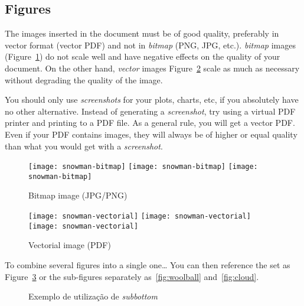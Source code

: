 	\subsection{Figures} %
	
	The images inserted in the document must be of good quality, preferably in vector format (vector PDF) and not in \emph{bitmap} (PNG, JPG, etc.). \emph{bitmap} images (Figure~\ref{fig:Figures_Tree_silhouettes-bitmap}) do not scale well and have negative effects on the quality of your document. On the other hand, \emph{vector} images {Figure~\ref{fig:Figures_Tree_silhouettes-vectorial}} scale as much as necessary without degrading the quality of the image.
	
	You should only use \emph{screenshots} for your plots, charts, etc, if you absolutely have no other alternative. Instead of generating a \emph{screenshot}, try using a virtual PDF printer and printing to a PDF file. As a general rule, you will get a vector PDF. Even if your PDF contains images, they will always be of higher or equal quality than what you would get with a \emph{screenshot}.
	
	\begin{figure}[htbp]
		\centering
		\texttt{[image: snowman-bitmap]}
		\texttt{[image: snowman-bitmap]}
		\texttt{[image: snowman-bitmap]}
		\caption{Bitmap image (JPG/PNG)}
		\label{fig:Figures_Tree_silhouettes-bitmap}
	\end{figure}
	
	\begin{figure}[htbp]
		\centering
		\texttt{[image: snowman-vectorial]}
		\texttt{[image: snowman-vectorial]}
		\texttt{[image: snowman-vectorial]}
		\caption{Vectorial image (PDF)}
		\label{fig:Figures_Tree_silhouettes-vectorial}
	\end{figure}
	
	To combine several figures into a single one… You can then reference the set as Figure~\ref{fig:complete-figure} or the sub-figures separately as~\ref{fig:woolball} and~\ref{fig:cloud}.
	
	\begin{figure}[htbp]
		\centering
		\qquad\qquad
		\caption{Exemplo de utilização de \emph{subbottom}}
		\label{fig:complete-figure}
	\end{figure}
	
